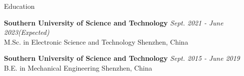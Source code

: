 \documentclass{resume} %
\begin{document}

\begin{rSection}{Education}

{\bf Southern University of Science and Technology} \hfill {\em Sept. 2021 - June 2023(Expected)} \\ 
{M.Sc. in Electronic Science and Technology} \hfill {Shenzhen, China}

{\bf Southern University of Science and Technology} \hfill {\em Sept. 2015 - June 2019} \\ 
{B.E. in Mechanical Engineering} \hfill {Shenzhen, China}

\end{rSection}

\end{document}
